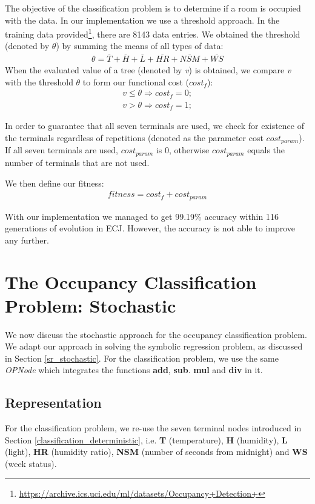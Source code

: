 The objective of the classification problem is to determine if a room is occupied with the data. In our implementation we use a threshold approach. In the training data provided\footnote{\url{https://archive.ics.uci.edu/ml/datasets/Occupancy+Detection+}}, there are 8143 data entries. We obtained the threshold (denoted by $\theta$) by summing the means of all types of data:
\begin{align*}
\theta = \overline{T} + \overline{H} + \overline{L} + \overline{HR} + \overline{NSM} + \overline{WS}
\end{align*}
When the evaluated value of a tree (denoted by \emph{v}) is obtained, we compare \emph{v} with the threshold $\theta$ to form our functional cost ($cost_f$):
\begin{align*}
v \leq \theta \Rightarrow cost_f = 0;\\
v > \theta \Rightarrow cost_f = 1;
\end{align*}

In order to guarantee that all seven terminals are used, we check for existence of the terminals regardless of repetitions (denoted as the parameter cost $cost_{param}$). If all seven terminals are used, $cost_{param}$ is 0, otherwise $cost_{param}$ equals the number of terminals that are not used. 

We then define our fitness:
\begin{align*}
fitness = cost_f + cost_{param}
\end{align*}

With our implementation we managed to get 99.19\% accuracy within 116 generations of evolution in ECJ. However, the accuracy is not able to improve any further.

\section{The Occupancy Classification Problem: Stochastic}
We now discuss the stochastic approach for the occupancy classification problem. We adapt our approach in solving the symbolic regression problem, as discussed in Section \ref{sr_stochastic}. For the classification problem, we use the same \emph{OPNode} which integrates the functions \textbf{add}, \textbf{sub}. \textbf{mul} and \textbf{div} in it. 

\subsection{Representation}
For the classification problem, we re-use the seven terminal nodes introduced in Section \ref{classification_deterministic}, i.e. \textbf{T} (temperature), \textbf{H} (humidity), \textbf{L} (light), \textbf{HR} (humidity ratio), \textbf{NSM} (number of seconds from midnight) and \textbf{WS} (week status). 

